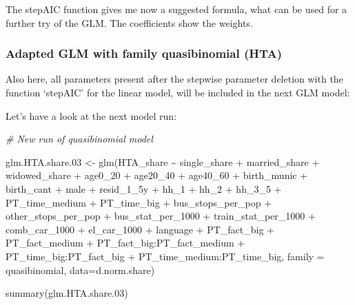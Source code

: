 \documentclass[
]{article}
\newenvironment{Shaded}{\begin{snugshade}}{\end{snugshade}}
\newcommand{\AttributeTok}[1]{\textcolor[rgb]{0.77,0.63,0.00}{#1}}
\newcommand{\CommentTok}[1]{\textcolor[rgb]{0.56,0.35,0.01}{\textit{#1}}}
\newcommand{\FloatTok}[1]{\textcolor[rgb]{0.00,0.00,0.81}{#1}}
\newcommand{\FunctionTok}[1]{\textcolor[rgb]{0.00,0.00,0.00}{#1}}
\newcommand{\NormalTok}[1]{#1}
\newcommand{\OtherTok}[1]{\textcolor[rgb]{0.56,0.35,0.01}{#1}}
\newcommand{\SpecialCharTok}[1]{\textcolor[rgb]{0.00,0.00,0.00}{#1}}
\begin{document}
The stepAIC function gives me now a suggested formula, what can be used
for a further try of the GLM. The coefficients show the weights.

\hypertarget{adapted-glm-with-family-quasibinomial-hta}{%
\subsubsection{\texorpdfstring{Adapted GLM with family quasibinomial
(HTA)\newline}{Adapted GLM with family quasibinomial (HTA)}}\label{adapted-glm-with-family-quasibinomial-hta}}

Also here, all parameters present after the stepwise parameter deletion
with the function `stepAIC' for the linear model, will be included in
the next GLM model:

Let's have a look at the next model run:

\begin{Shaded}
\begin{Highlighting}[]
\CommentTok{\# New run of quasibinomial model}

\NormalTok{glm.HTA.share}\FloatTok{.03} \OtherTok{\textless{}{-}} \FunctionTok{glm}\NormalTok{(HTA\_share }\SpecialCharTok{\textasciitilde{}}\NormalTok{ single\_share }\SpecialCharTok{+}\NormalTok{ married\_share }\SpecialCharTok{+}\NormalTok{ widowed\_share }\SpecialCharTok{+} 
\NormalTok{      age0\_20 }\SpecialCharTok{+}\NormalTok{ age20\_40 }\SpecialCharTok{+}\NormalTok{ age40\_60 }\SpecialCharTok{+}\NormalTok{ birth\_munic }\SpecialCharTok{+}\NormalTok{ birth\_cant }\SpecialCharTok{+}\NormalTok{ male }\SpecialCharTok{+}\NormalTok{ resid\_1\_5y }\SpecialCharTok{+} 
\NormalTok{      hh\_1 }\SpecialCharTok{+}\NormalTok{ hh\_2 }\SpecialCharTok{+}\NormalTok{ hh\_3\_5 }\SpecialCharTok{+}\NormalTok{ PT\_time\_medium }\SpecialCharTok{+}\NormalTok{ PT\_time\_big }\SpecialCharTok{+}\NormalTok{ bus\_stops\_per\_pop }\SpecialCharTok{+} 
\NormalTok{      other\_stops\_per\_pop }\SpecialCharTok{+}\NormalTok{ bus\_stat\_per\_1000 }\SpecialCharTok{+}\NormalTok{ train\_stat\_per\_1000 }\SpecialCharTok{+}\NormalTok{ comb\_car\_1000 }\SpecialCharTok{+}
\NormalTok{      el\_car\_1000 }\SpecialCharTok{+}\NormalTok{ language }\SpecialCharTok{+}\NormalTok{ PT\_fact\_big }\SpecialCharTok{+}\NormalTok{ PT\_fact\_medium }\SpecialCharTok{+}\NormalTok{ PT\_fact\_big}\SpecialCharTok{:}\NormalTok{PT\_fact\_medium }\SpecialCharTok{+} 
\NormalTok{      PT\_time\_big}\SpecialCharTok{:}\NormalTok{PT\_fact\_big }\SpecialCharTok{+}\NormalTok{ PT\_time\_medium}\SpecialCharTok{:}\NormalTok{PT\_time\_big, }
      \AttributeTok{family =}\NormalTok{ quasibinomial, }\AttributeTok{data=}\NormalTok{d.norm.share)}

\FunctionTok{summary}\NormalTok{(glm.HTA.share}\FloatTok{.03}\NormalTok{)}
\end{Highlighting}
\end{Shaded}
\end{document}
